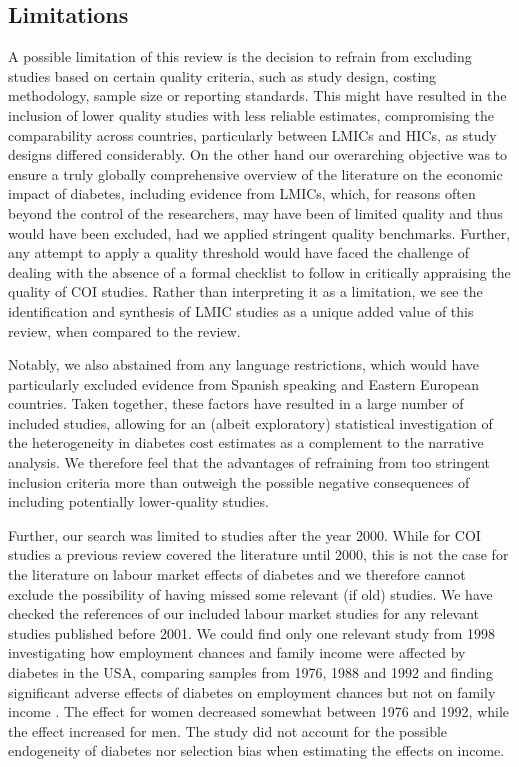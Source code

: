 \subsection{Limitations}
A possible limitation of this review is the decision to refrain from excluding studies based on certain quality criteria, such as study design, costing methodology, sample size or reporting standards. This might have resulted in the inclusion of lower quality studies with less reliable estimates, compromising the comparability across countries, particularly between \acp{LMIC} and \acp{HIC}, as study designs differed considerably. On the other hand our overarching objective was to ensure a truly globally comprehensive overview of the literature on the economic impact of diabetes, including evidence from \acp{LMIC}, which, for reasons often beyond the control of the researchers, may have been of limited quality and thus would have been excluded, had we applied stringent quality benchmarks. Further, any attempt to apply a quality threshold would have faced the challenge of dealing with the absence of a formal checklist to follow in critically appraising the quality of \ac{COI} studies. Rather than interpreting it as a limitation, we see the identification and synthesis of \ac{LMIC} studies as a unique added value of this review, when compared to the \textcite{Ettaro2004} review. 

Notably, we also abstained from any language restrictions, which would have particularly excluded evidence from Spanish speaking and Eastern European countries. Taken together, these factors have resulted in a large number of included studies, allowing for an (albeit exploratory) statistical investigation of the heterogeneity in diabetes cost estimates as a complement to the narrative analysis. We therefore feel that the advantages of refraining from too stringent inclusion criteria more than outweigh the possible negative consequences of including potentially lower-quality studies.

Further, our search was limited to studies after the year 2000. While for \ac{COI} studies a previous review covered the literature until 2000, this is not the case for the literature on labour market effects of diabetes and we therefore cannot exclude the possibility of having missed some relevant (if old) studies. We have checked the references of our included labour market
studies for any relevant studies published before 2001. We could find only one relevant study from 1998 investigating how employment
chances and family income were affected by diabetes in the USA, comparing samples from 1976, 1988 and 1992 and finding significant
adverse effects of diabetes on employment chances but not on family income \parencite{Kahn1998b}. The effect for women decreased somewhat between 1976 and 1992, while the effect increased for men. The study did not account for the possible endogeneity of diabetes nor selection bias when estimating the effects on income.

